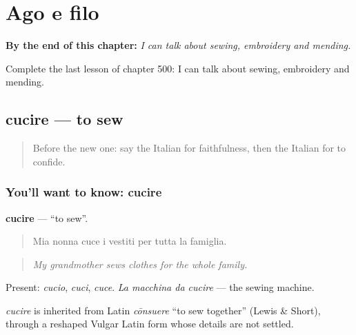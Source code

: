 
\chapter{Ago e filo}
\label{ch:it-ago-e-filo}

\begin{chapteropening}
\textbf{By the end of this chapter:} \emph{I can talk about sewing, embroidery and mending.}

Complete the last lesson of chapter 500: I can talk about sewing, embroidery and mending.
\end{chapteropening}

\section[cucire]{cucire — to sew}

\label{lesson:IT-C500-cucire}



\begin{quote}
Before the new one: say the Italian for faithfulness, then the Italian for to confide.
\end{quote}

\subsection*{You'll want to know: cucire}
\textbf{cucire} — \textquotedblleft{}to sew\textquotedblright{}.

\begin{quote}
Mia nonna cuce i vestiti per tutta la famiglia.
\end{quote}

\begin{quote}
\emph{My grandmother sews clothes for the whole family.}
\end{quote}

Present: \emph{cucio}, \emph{cuci}, \emph{cuce}. \emph{La macchina da cucire} — the sewing machine.

\begin{cousinweb}
\emph{cucire} is inherited from Latin \emph{cōnsuere} \textquotedblleft{}to sew together\textquotedblright{} (Lewis \& Short), through a reshaped Vulgar Latin form whose details are not settled.
\end{cousinweb}

